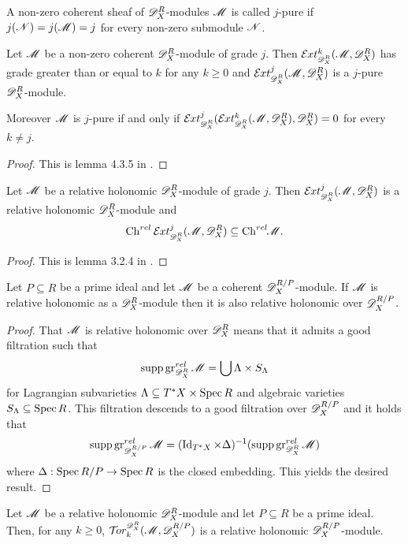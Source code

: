 \begin{definition}
  A non-zero coherent sheaf of $\mathscr{D}_X^R$-modules $\mathscr{M}$ is called $j$-pure if $j(\mathscr{N})=j(\mathscr{M})=j$ for every non-zero submodule $\mathscr{N}$.
\end{definition}
\begin{lemma}\label{lem: ExtGrade}
  Let $\mathscr{M}$ be a non-zero coherent $\mathscr{D}_X^R$-module of grade $j$. Then $\Ex{\D_X^R}{k}(\M,\D_X^R)$ has grade greater than or equal to $k$ for any $k\geq 0$ and $\Ex{\D_X^R}{j}(\M,\D_X^R)$ is a $j$-pure $\mathscr{D}_X^R$-module.

  Moreover $\mathscr{M}$ is $j$-pure if and only if $\Ex{\D_X^R}{j}(\Ex{\D_X^R}{k}(\M,\D_X^R),\D_X^R)=0$ for every $k\neq j$.
\end{lemma}
\begin{proof}
  This is lemma 4.3.5 in \cite{budur2019zero}.
\end{proof}
\begin{lemma}
  Let $\mathscr{M}$ be a relative holonomic $\mathscr{D}_X^R$-module of grade $j$. Then $\Ex{\D_X^R}{j}(\M,\D_X^R)$ is a relative holonomic $\mathscr{D}_X^R$-module and
  $$\Ch^{rel}\Ex{\D_X^R}{j}(\M,\D_X^R)\subseteq \Chrel \M. $$
\end{lemma}
\begin{proof}
  This is lemma 3.2.4 in \cite{budur2019zero}.
\end{proof}
\begin{lemma}
  Let $P \subseteq R$ be a prime ideal and let $\mathscr{M}$ be a coherent $\mathscr{D}_X^{R/P}$-module. If $\mathscr{M}$ is relative holonomic as a $\mathscr{D}_X^R$-module then it is also relative holonomic over $\mathscr{D}_X^{R/P}$.
\end{lemma}
\begin{proof}
  That $\mathscr{M}$ is relative holonomic over $\mathscr{D}_X^{R}$ means that it admits a good filtration such that
  $$\operatorname{supp} \operatorname{gr}_{\mathscr{D}_X^R}^{rel} \mathscr{M}  = \bigcup \Lambda \times S_\Lambda $$
  for Lagrangian subvarieties $\Lambda \subseteq T^* X \times \operatorname{Spec} R$ and algebraic varieties $S_\Lambda \subseteq \operatorname{Spec} R$.
  This filtration descends to a good filtration over $\mathscr{D}_{X}^{R/P}$ and it holds that
  $$\operatorname{supp} \operatorname{gr}_{\mathscr{D}_X^{R/P}}^{rel}\mathscr{M} = (\operatorname{Id}_{T^*X} \times \Delta)^{-1}(\operatorname{supp} \operatorname{gr}_{\mathscr{D}_X^R}^{rel}\mathscr{M})$$
  where $\Delta:\operatorname{Spec} R/P\to \operatorname{Spec} R$ is the closed embedding.
  This yields the desired result.
\end{proof}
\begin{lemma}\label{lem: TorRelHol}
  Let $\mathscr{M}$ be a relative holonomic $\mathscr{D}_X^R$-module and let $P\subseteq R$ be a prime ideal. Then, for any $k\geq 0$, $\Tr{\D_X^R}{k}(\M, \D_X^{R/P})$ is a relative holonomic $\mathscr{D}_X^{R/P}$-module.
 \end{lemma}
